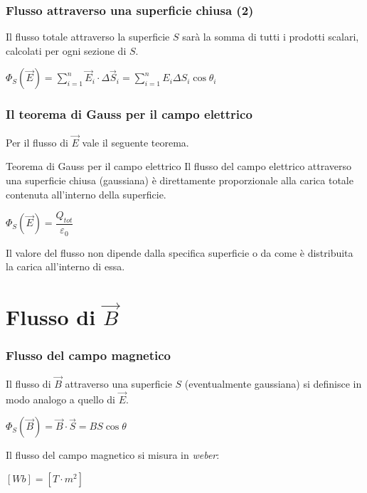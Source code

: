 \documentclass[]{beamer}
\theoremstyle{plain}
\begin{document}
\begin{frame}
  \frametitle{Flusso attraverso una superficie chiusa (2)}
  Il flusso totale attraverso la superficie $ S $ sarà la \alert<1>{somma di tutti i prodotti scalari}, calcolati per ogni sezione di $ S $.
   \begin{center}
   \colorbox{blue!30}{$ \Phi_S (\vec{E}) = \sum\limits_{i=1}^n \vec{E}_i \cdot \Delta \vec{S}_i =  \sum\limits_{i=1}^n E_i \Delta S_i \cos\theta_i $}
   \end{center}
\end{frame}




\begin{frame}
  \frametitle{Il teorema di Gauss per il campo elettrico}
  Per il flusso di $ \vec{E} $ vale il seguente teorema.
  \begin{block}{Teorema di Gauss per il campo elettrico}
    Il flusso del campo elettrico attraverso una superficie chiusa (gaussiana) è direttamente proporzionale alla carica totale contenuta all'interno della superficie.
    \begin{center}
   \colorbox{blue!30}{$ \Phi_S (\vec{E}) = \dfrac{Q_{tot}}{\varepsilon_0} $}
   \end{center}
  \end{block}\pause
  Il valore del flusso non dipende dalla specifica superficie o da come è distribuita la carica all'interno di essa.
\end{frame}




\section{Flusso di $ \vec{B} $}



\begin{frame}
  \frametitle{Flusso  del campo magnetico}
  Il flusso di $ \vec{B} $ attraverso una superficie $ S $ (eventualmente gaussiana) si definisce in modo analogo a quello di $ \vec{E} $. 
  \begin{center}
   \colorbox{blue!30}{$ \Phi_{S}(\vec{B}) = \vec{B} \cdot \vec{S} = BS\cos\theta $}
\end{center}\pause
Il flusso del campo magnetico si misura in \emph{weber}:
\begin{center}
$ [Wb] = [T\cdot m^2] $
\end{center}
\end{frame}
\end{document}
